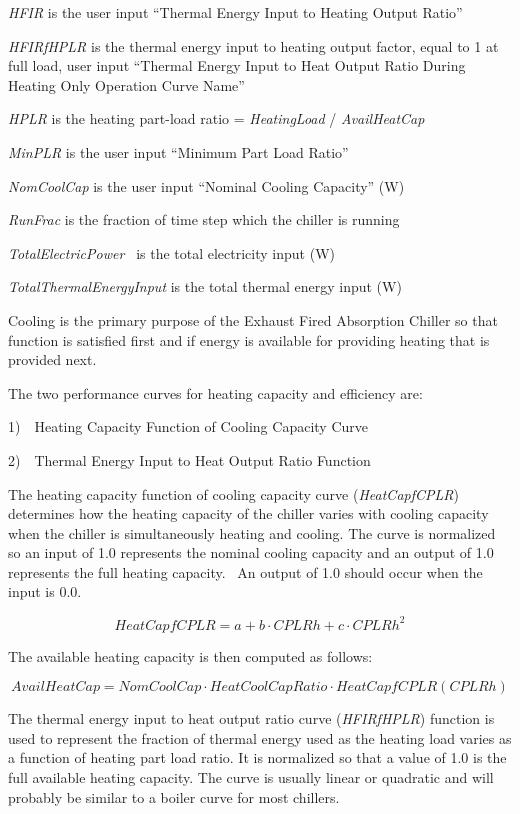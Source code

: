 \emph{HFIR} is the user input ``Thermal Energy Input to Heating Output Ratio''

\emph{HFIRfHPLR} is the thermal energy input to heating output factor, equal to 1 at full load, user input ``Thermal Energy Input to Heat Output Ratio During Heating Only Operation Curve Name''

\emph{HPLR} is the heating part-load ratio = \emph{HeatingLoad} / \emph{AvailHeatCap}

\emph{MinPLR} is the user input ``Minimum Part Load Ratio''

\emph{NomCoolCap} is the user input ``Nominal Cooling Capacity'' (W)

\emph{RunFrac} is the fraction of time step which the chiller is running

\emph{TotalElectricPower~} is the total electricity input (W)

\emph{TotalThermalEnergyInput} is the total thermal energy input (W)

Cooling is the primary purpose of the Exhaust Fired Absorption Chiller so that function is satisfied first and if energy is available for providing heating that is provided next.

The two performance curves for heating capacity and efficiency are:

1)~~Heating Capacity Function of Cooling Capacity Curve

2)~~Thermal Energy Input to Heat Output Ratio Function

The heating capacity function of cooling capacity curve (\emph{HeatCapfCPLR}) determines how the heating capacity of the chiller varies with cooling capacity when the chiller is simultaneously heating and cooling. The curve is normalized so an input of 1.0 represents the nominal cooling capacity and an output of 1.0 represents the full heating capacity.~ An output of 1.0 should occur when the input is 0.0.

\begin{equation}
HeatCapfCPLR = a + b \cdot CPLRh + c \cdot CPLR{h^2}
\end{equation}

The available heating capacity is then computed as follows:

\begin{equation}
AvailHeatCap = NomCoolCap \cdot HeatCoolCapRatio \cdot HeatCapfCPLR(CPLRh)
\end{equation}

The thermal energy input to heat output ratio curve (\emph{HFIRfHPLR}) function is used to represent the fraction of thermal energy used as the heating load varies as a function of heating part load ratio. It is normalized so that a value of 1.0 is the full available heating capacity. The curve is usually linear or quadratic and will probably be similar to a boiler curve for most chillers.

